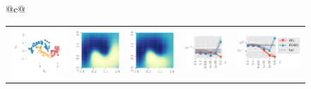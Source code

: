 \documentclass{article}
\theoremstyle{definition}
\newcommand{\mbf}[1]{\mathbf{#1}}
\newcommand{\mcl}[1]{\mathcal{#1}}
\newcommand{\dc}{\mcl{D}_r}
\newcommand{\dr}{\mcl{D}_e}
\begin{document}
%
\begin{figure}
\hspace{-2mm}
\begin{tabular}{@{}c@{}}
    \begin{tabular}{@{}c@{}c@{}c@{}c@{}c@{}}
    \includegraphics[trim={7mm 8mm 3mm 3mm}, clip,height=0.16\textwidth]{img/moon/moon_data.pdf}
    &
    \includegraphics[height=0.15\textwidth]{img/moon/moon_full_prob.pdf}
    &
    \includegraphics[height=0.15\textwidth]{img/moon/moon_remain_prob.pdf}
    & \hspace{-2mm}
    \includegraphics[height=0.15\textwidth]{img/likelihood_diff/moon_gauss_fullcov_likelihood_remain_retrain_f.pdf}
    &
    \includegraphics[height=0.15\textwidth]{img/likelihood_diff/moon_gauss_fullcov_likelihood_remove_retrain_f_legend.pdf}

\end{tabular}
\end{tabular}
\end{figure}
\end{document}
